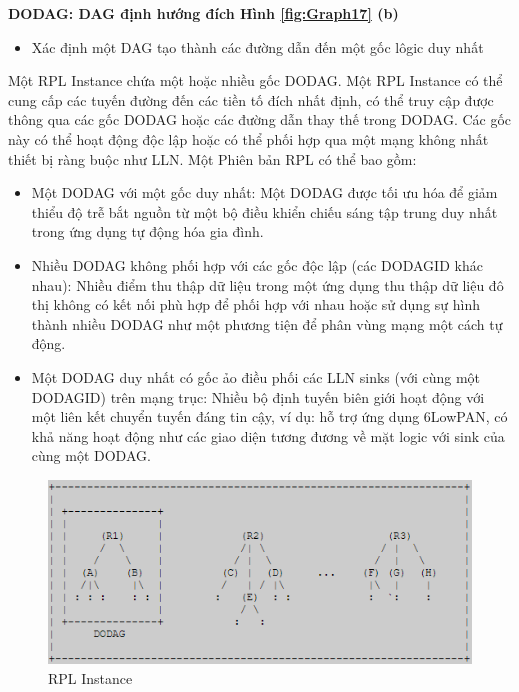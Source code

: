 \documentclass{report}
\begin{document}
\textbf{DODAG: DAG định hướng đích Hình \ref{fig:Graph17} (b)} 
\begin{itemize}
	\item Xác định một DAG tạo thành các đường dẫn đến một gốc lôgic duy nhất
\end{itemize} 

Một RPL Instance chứa một hoặc nhiều gốc DODAG. Một RPL Instance có thể cung cấp các tuyến đường đến các tiền tố đích nhất định, có thể truy cập được thông qua các gốc DODAG hoặc các đường dẫn thay thế trong DODAG. Các gốc này có thể hoạt động độc lập hoặc có thể phối hợp qua một mạng không nhất thiết bị ràng buộc như LLN. Một Phiên bản RPL có thể bao gồm:
\begin{itemize}
	\item Một DODAG với một gốc duy nhất: Một DODAG được tối ưu hóa để giảm thiểu độ trễ bắt nguồn từ một bộ điều khiển chiếu sáng tập trung duy nhất trong ứng dụng tự động hóa gia đình.
	\item Nhiều DODAG không phối hợp với các gốc độc lập (các DODAGID khác nhau): Nhiều điểm thu thập dữ liệu trong một ứng dụng thu thập dữ liệu đô thị không có kết nối phù hợp để phối hợp với nhau hoặc sử dụng sự hình thành nhiều DODAG như một phương tiện để phân vùng mạng một cách tự động.
	\item Một DODAG duy nhất có gốc ảo điều phối các LLN sinks (với cùng một DODAGID) trên mạng trục: Nhiều bộ định tuyến biên giới hoạt động với một liên kết chuyển tuyến đáng tin cậy, ví dụ: hỗ trợ ứng dụng 6LowPAN, có khả năng hoạt động như các giao diện tương đương về mặt logic với sink của cùng một DODAG.
\end{itemize}

\begin{figure}[h]
	\centering
	\includegraphics[scale = 0.7]{fig19.png}
	\caption{RPL Instance}
	\label{fig:Graph19}
\end{figure}
\end{document}
